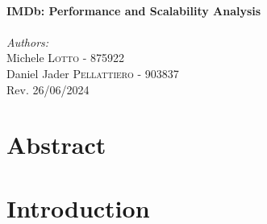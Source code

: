 \documentclass[12pt, twoside]{report}
\begin{document}
\begin{titlepage}
		\HRule \\[0.8cm]
		{ \Huge \bfseries IMDb: Performance and Scalability Analysis }\\[0.5cm]
		\HRule \\[0.8cm]
		
		
		\Large \emph{Authors:}\\
		Michele \textsc{Lotto} - {\large 875922}\\
		Daniel Jader \textsc{Pellattiero} - {\large 903837}\\[3.5cm]
		
		
		{\large Rev. 26/06/2024  }\\
		
		\vfill
		
	\end{titlepage}

	\tableofcontents
	\listoftables
	\listoffigures

	\chapter*{Abstract}

	\chapter{Introduction}
	\setcounter{page}{1}



\end{document}
